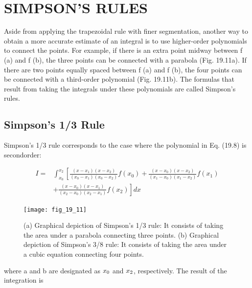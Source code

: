 \documentclass[../main.tex]{subfiles}
\begin{document}
\section{SIMPSON'S RULES}
Aside from applying the trapezoidal rule with finer segmentation, another way to obtain a
more accurate estimate of an integral is to use higher-order polynomials to connect the
points. For example, if there is an extra point midway between f (a) and f (b), the three
points can be connected with a parabola (Fig. 19.11a). If there are two points equally
spaced between f (a) and f (b), the four points can be connected with a third-order polynomial (Fig. 19.11b). The formulas that result from taking the integrals under these polynomials are called Simpson's rules.

\subsection{Simpson's 1/3 Rule}

Simpson's 1/3 rule corresponds to the case where the polynomial in Eq. (19.8) is secondorder:

\begin{equation}
	\begin{aligned}
	I=& \int_{x_{0}}^{x_{2}}\left[\frac{\left(x-x_{1}\right)\left(x-x_{2}\right)}{\left(x_{0}-x_{1}\right)\left(x_{0}-x_{2}\right)} f\left(x_{0}\right)+\frac{\left(x-x_{0}\right)\left(x-x_{2}\right)}{\left(x_{1}-x_{0}\right)\left(x_{1}-x_{2}\right)} f\left(x_{1}\right)\right.\\
	&\left.+\frac{\left(x-x_{0}\right)\left(x-x_{1}\right)}{\left(x_{2}-x_{0}\right)\left(x_{2}-x_{1}\right)} f\left(x_{2}\right)\right] d x
	\end{aligned} \nonumber
	\end{equation}

	\begin{figure}[H]
		\centering
		\texttt{[image: fig\_19\_11]}
	   \caption{\textsf{(a) Graphical depiction of Simpson's 1/3 rule: It consists of taking the area under a parabola
	   connecting three points. (b) Graphical depiction of Simpson's 3/8 rule: It consists of taking the
	   area under a cubic equation connecting four points.}}\label{fig:fig_19_11}
	\end{figure}
	where a and b are designated as $x\textsubscript{0}$ and $x\textsubscript{2}$, respectively. The result of the integration is
\end{document}
